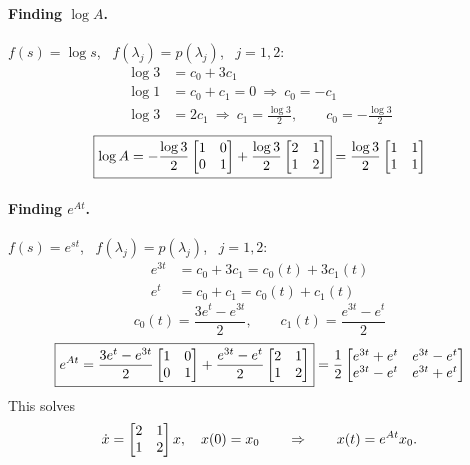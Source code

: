 \begin{example}
\paragraph{Finding $\log A$.} $f(s) = \log s$, \ $f(\lambda_j) = p(\lambda_j)$, \ $j = 1,2$:
\begin{align*}
\log 3 &= c_0 + 3c_1\\
\log 1 &= c_0 + c_1 = 0 \ \Rightarrow\ c_0 = -c_1 \\ %
\log 3 &= 2c_1 \ \Rightarrow\ c_1 = \frac{\log 3}{2}, \qquad c_0 = -\frac{\log 3}{2} %
\end{align*}
\[
\boxed{\log A = -\frac{\log 3}{2}\begin{bmatrix}1&0\\0&1\end{bmatrix} + \frac{\log 3}{2}\begin{bmatrix}2&1\\1&2\end{bmatrix}}
= \frac{\log 3}{2}\begin{bmatrix}1&1\\1&1\end{bmatrix}
\]

\paragraph{Finding $e^{At}$.} $f(s) = e^{st}$, \ $f(\lambda_j) = p(\lambda_j)$, \ $j = 1,2$:
\begin{align*}
e^{3t} &= c_0 + 3c_1 = c_0(t) + 3c_1(t)\\
e^{t} &= c_0 + c_1 = c_0(t) + c_1(t)
\end{align*}
\[
c_0(t) = \frac{3e^t - e^{3t}}{2}, \qquad c_1(t) = \frac{e^{3t}-e^t}{2}
\]
\[
\boxed{e^{At} = \frac{3e^t-e^{3t}}{2}\begin{bmatrix}1&0\\0&1\end{bmatrix} + \frac{e^{3t}-e^t}{2}\begin{bmatrix}2&1\\1&2\end{bmatrix}}
= \frac12\begin{bmatrix}e^{3t}+e^t & e^{3t}-e^t\\ e^{3t}-e^t & e^{3t}+e^t\end{bmatrix}
\]
This solves
\[
\dot{x} = \begin{bmatrix}2&1\\1&2\end{bmatrix}x,\quad x(0)=x_0
\qquad\Rightarrow\qquad x(t) = e^{At}x_0 .
\]
\end{example}

